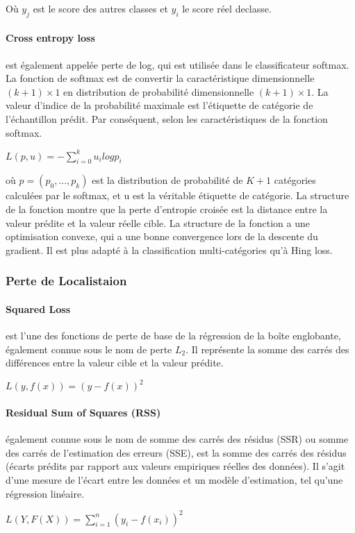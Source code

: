           Où $y_j$ est le score des autres classes et $y_i$ le score réel declasse.	

          \paragraph{Cross entropy loss}
          est également appelée perte de log, qui est utilisée dans le classificateur softmax. La fonction de softmax est de convertir la caractéristique dimensionnelle $(k+1)\times1$ en distribution de probabilité dimensionnelle $(k+1)\times1$. La valeur d'indice de la probabilité maximale est l'étiquette de catégorie de l'échantillon prédit. Par conséquent, selon les caractéristiques de la fonction softmax.
          \begin{center} $L(p,u)=-\sum_{i=0}^{k}u_i log p_i$ \end{center}
          où $p=(p_0,..., p_k)$ est la distribution de probabilité de $K+1$ catégories calculées par le softmax, et u est la véritable étiquette de catégorie. La structure de la fonction montre que la perte d'entropie croisée est la distance entre la valeur prédite et la valeur réelle cible. La structure de la fonction a une optimisation convexe, qui a une bonne convergence lors de la descente du gradient. Il est plus adapté à la classification multi-catégories qu'à Hing loss.
     
     \subsubsection{Perte de Localistaion}
          \paragraph{Squared Loss}
          est l'une des fonctions de perte de base de la régression de la boîte englobante, également connue sous le nom de perte $L_2$. Il représente la somme des carrés des différences entre la valeur cible et la valeur prédite.
          \begin{center} $L(y, f(x)) = (y - f(x))^2$ \end{center}

          \paragraph{Residual Sum of Squares (RSS)}
          également connue sous le nom de somme des carrés des résidus (SSR) ou somme des carrés de l'estimation des erreurs (SSE), est la somme des carrés des résidus (écarts prédits par rapport aux valeurs empiriques réelles des données). Il s'agit d'une mesure de l'écart entre les données et un modèle d'estimation, tel qu'une régression linéaire.
          \begin{center} $L(Y, F(X)) = \sum_{i=1}^{n}(y_i - f(x_i))^2$ \end{center}


